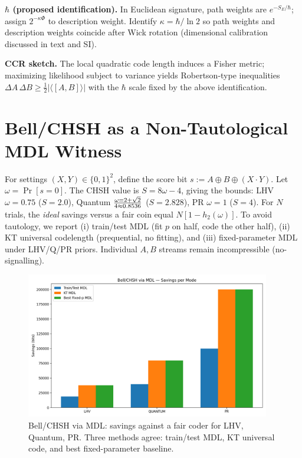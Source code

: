 \documentclass[aps,preprint,onecolumn,longbibliography,nofootinbib]{revtex4-2}
\numberwithin{equation}{section}        %
\begin{document}
\textbf{$\hbar$ (proposed identification).} In Euclidean signature, path weights are $e^{-S_E/\hbar}$; assign $2^{-\kappa \Phi}$ to description weight. Identify $\kappa=\hbar/\ln 2$ so path weights and description weights coincide after Wick rotation (dimensional calibration discussed in text and SI).

\textbf{CCR sketch.} The local quadratic code length induces a Fisher metric; maximizing likelihood subject to variance yields Robertson-type inequalities $\Delta A\,\Delta B\ge \tfrac{1}{2}|\langle[A,B]\rangle|$ with the $\hbar$ scale fixed by the above identification.

\section{Bell/CHSH as a Non-Tautological MDL Witness}\label{app:BELL}
For settings $(X,Y)\in\{0,1\}^2$, define the score bit $s:=A\oplus B\oplus (X\cdot Y)$. Let $\omega=\Pr[s=0]$. The CHSH value is $S=8\omega-4$, giving the bounds:
LHV $\omega=0.75$ ($S=2.0$), Quantum $\omega=2+\sqrt{2}\over 4\approx 0.8536$ ($S=2.828$), PR $\omega=1$ ($S=4$). For $N$ trials, the \emph{ideal} savings versus a fair coin equal $N[1-h_2(\omega)]$.
To avoid tautology, we report (i) train/test MDL (fit $p$ on half, code the other half), (ii) KT universal codelength \cite{KrichevskyTrofimov1981} (prequential, no fitting), and (iii) fixed-parameter MDL under LHV/Q/PR priors. Individual $A,B$ streams remain incompressible (no-signalling).

\begin{figure}[H]
\centering
\includegraphics[width=0.95\textwidth]{Bell_CHSH_via_MDL_Savings_per_Mode.png}
\caption{Bell/CHSH via MDL: savings against a fair coder for LHV, Quantum, PR. Three methods agree: train/test MDL, KT universal code, and best fixed-parameter baseline.}
\label{fig:bell_savings_bar}
\end{figure}
\end{document}
